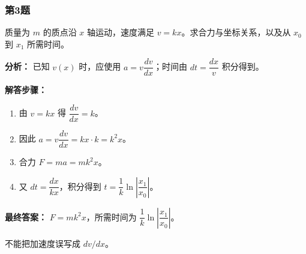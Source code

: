 \documentclass[12pt,a4paper]{ctexart}
\begin{document}
\subsubsection*{第3题}
\begin{tcolorbox}[colback=gray!2!white,colframe=black!60,title={题目}]
质量为 \(m\) 的质点沿 \(x\) 轴运动，速度满足 \(v=kx\)。求合力与坐标关系，以及从 \(x_0\) 到 \(x_1\) 所需时间。\par
\end{tcolorbox}
\begin{tcolorbox}[colback=blue!2!white,colframe=blue!55!black,title={完整答案}]
\textbf{分析：}
已知 \(v(x)\) 时，应使用 \(a=v\dfrac{dv}{dx}\)；时间由 \(dt=\dfrac{dx}{v}\) 积分得到。\par
\textbf{解答步骤：}
\begin{enumerate}
\item 由 \(v=kx\) 得 \(\dfrac{dv}{dx}=k\)。
\item 因此 \(a=v\dfrac{dv}{dx}=kx\cdot k=k^2x\)。
\item 合力 \(F=ma=mk^2x\)。
\item 又 \(dt=\dfrac{dx}{kx}\)，积分得到 \(t=\dfrac1k\ln\left|\dfrac{x_1}{x_0}\right|\)。
\end{enumerate}
\textbf{最终答案：}
\(F=mk^2x\)，所需时间为 \(\dfrac1k\ln\left|\dfrac{x_1}{x_0}\right|\)。\par
\end{tcolorbox}
\begin{tcolorbox}[colback=red!2!white,colframe=red!55!black,title={易错点}]
不能把加速度误写成 \(dv/dx\)。\par
\end{tcolorbox}
\end{document}
